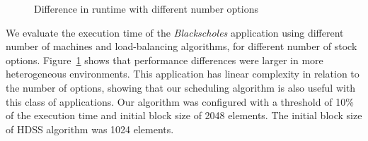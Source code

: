 \documentclass[journal]{IEEEtran}
\begin{document}
\begin{figure}[htb]
	\begin{center}
	\centering

	\caption{Difference in runtime with different number options}
	\label{fig:black}
	\end{center}
\end{figure}

We evaluate the execution time of the \emph{Blackscholes} application using
different number of machines and load-balancing algorithms, for different number
of stock options. Figure~\ref{fig:black} shows that performance differences were
larger in more heterogeneous environments. This application has linear
complexity in relation to the number of options, showing that our scheduling
algorithm is also useful with this class of applications. Our algorithm was
configured with a threshold of 10\% of the execution time and initial block size
of 2048 elements. The initial block size of HDSS algorithm was 1024 elements.
\end{document}
